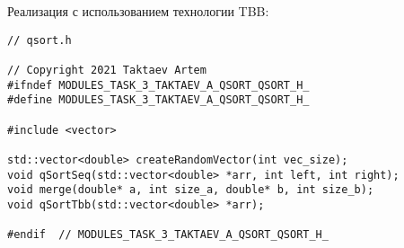 \documentclass{report}
\begin{document}
\par Реализация с использованием технологии TBB:

\begin{lstlisting}
// qsort.h

// Copyright 2021 Taktaev Artem
#ifndef MODULES_TASK_3_TAKTAEV_A_QSORT_QSORT_H_
#define MODULES_TASK_3_TAKTAEV_A_QSORT_QSORT_H_

#include <vector>

std::vector<double> createRandomVector(int vec_size);
void qSortSeq(std::vector<double> *arr, int left, int right);
void merge(double* a, int size_a, double* b, int size_b);
void qSortTbb(std::vector<double> *arr);

#endif  // MODULES_TASK_3_TAKTAEV_A_QSORT_QSORT_H_

\end{lstlisting}
\end{document}
